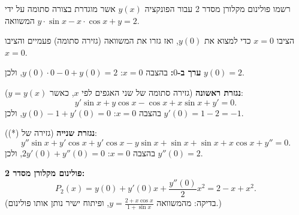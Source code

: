 
\begin{question}
רשמו פולינום מקלורן מסדר 2 עבור הפונקציה $y(x)$ אשר מוגדרת בצורה סתומה על ידי המשוואה $y\cdot\sin x-x\cdot\cos x+y=2$.
\end{question}

\begin{hint}
הציבו $x=0$ כדי למצוא את $y(0)$, ואז גזרו את המשוואה (גזירה סתומה) פעמיים והציבו $x=0$.
\end{hint}

\begin{solution}
\textbf{ערך ב-$0$:} בהצבה $x=0$: $y(0)\cdot0-0+y(0)=2$, ולכן $y(0)=2$.

\textbf{נגזרת ראשונה} (גזירה סתומה של שני האגפים לפי $x$, כאשר $y=y(x)$):
\[
y'\sin x+y\cos x-\cos x+x\sin x+y'=0.\tag{*}
\]
בהצבה $x=0$: $y(0)-1+y'(0)=0$, ולכן $y'(0)=1-2=-1$.

\textbf{נגזרת שנייה} (גזירה של (*)):
\[
y''\sin x+y'\cos x+y'\cos x-y\sin x+\sin x+\sin x+x\cos x+y''=0.
\]
בהצבה $x=0$: $2y'(0)+y''(0)=0$, ולכן $y''(0)=2$.

\textbf{פולינום מקלורן מסדר 2:}
\[
P_2(x)=y(0)+y'(0)x+\frac{y''(0)}{2}x^2=2-x+x^2.
\]
(בדיקה: מהמשוואה $y=\frac{2+x\cos x}{1+\sin x}$, ופיתוח ישיר נותן אותו פולינום.)
\end{solution}
